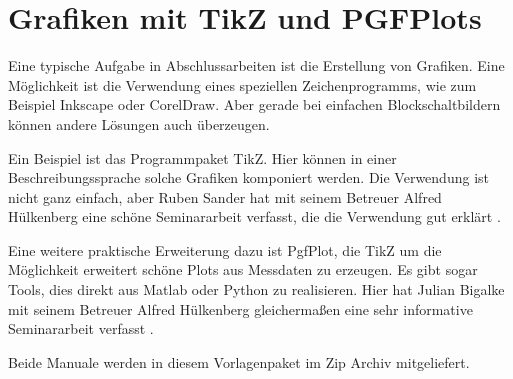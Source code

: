 \section{Grafiken mit TikZ und PGFPlots}

Eine typische Aufgabe in Abschlussarbeiten ist die Erstellung von Grafiken. Eine Möglichkeit ist die Verwendung eines speziellen Zeichenprogramms, wie zum Beispiel Inkscape oder CorelDraw. Aber gerade bei einfachen Blockschaltbildern können andere Lösungen auch überzeugen.

Ein Beispiel ist das Programmpaket TikZ. Hier können in einer Beschreibungssprache solche Grafiken komponiert werden.
Die Verwendung ist nicht ganz einfach, aber Ruben Sander hat mit seinem Betreuer Alfred Hülkenberg eine schöne Seminararbeit verfasst, die die Verwendung gut erklärt \cite{Sander2021}.

Eine weitere praktische Erweiterung dazu ist PgfPlot, die TikZ um die Möglichkeit erweitert schöne Plots aus Messdaten zu erzeugen. Es gibt sogar Tools, dies direkt aus Matlab oder Python zu realisieren. Hier hat Julian Bigalke mit seinem Betreuer Alfred Hülkenberg gleichermaßen eine sehr informative Seminararbeit verfasst \cite{Bigalke2023}.

Beide Manuale werden in diesem Vorlagenpaket im Zip Archiv mitgeliefert. 

\cite{abcde}